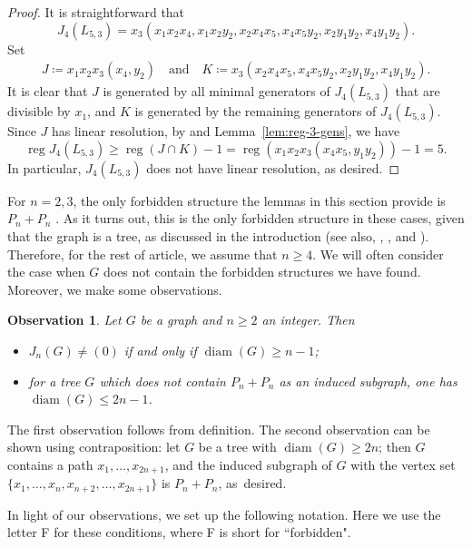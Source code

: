 \documentclass{amsart}
\newtheorem{observation}[theorem]{Observation}
\theoremstyle{remark}
\theoremstyle{definition}
\DeclareMathOperator{\reg}{reg}
\DeclareMathOperator{\diam}{diam}
\begin{document}
	\begin{proof}
		It is straightforward that 
		\[
		J_4(L_{5,3})= x_3(x_1x_2x_4,x_1x_2y_2,x_2x_4x_5,x_4x_5y_2,x_2y_1y_2,x_4y_1y_2).\]
		Set
		\begin{align*}
			J\coloneqq x_1x_2x_3(x_4,y_2) \quad \text{and} \quad 
			K\coloneqq x_3(x_2x_4x_5,x_4x_5y_2,x_2y_1y_2,x_4y_1y_2).
		\end{align*}
		It is clear that $J$ is generated by all minimal generators of $J_4(L_{5,3})$ that are divisible by $x_1$, and $K$ is generated by the remaining generators of $J_4(L_{5,3})$. Since $J$ has linear resolution, by \cite[Corollary 2.7]{FHV09} and Lemma~\ref{lem:reg-3-gens}, we have 
		\[
		\reg J_4(L_{5,3}) \geq \reg(J\cap K) - 1 = \reg \left( x_1x_2x_3(x_4x_5, y_1y_2) \right) -1 = 5.
		\]
		In particular, $J_4(L_{5,3})$ does not have linear resolution, as desired.
	\end{proof}
	
    For $n=2,3$, the only forbidden structure the lemmas in this section provide is $P_n+P_n$ . As it turns out, this is the only forbidden structure in these cases, given that the graph is a tree, as discussed in the introduction (see also, \cite[Proposition 3.9]{Zheng2004}, \cite[Theorem 3.2]{HHZ2004}, and  \cite[Theorem 5.1]{AJM2024}). Therefore, for the rest of article, we assume that $n\geq 4$. We will often consider the case when $G$ does not contain the forbidden structures we have found. Moreover, we make some observations.
    \begin{observation}\label{obser}
     Let $G$ be a graph and $n\geq 2$ an integer. Then
        \begin{itemize}
            \item $J_n(G)\neq (0)$ if and only if $\diam(G)\geq n-1$;
            \item for a tree $G$ which does not contain $P_n+P_n$ as an induced subgraph, one has $\diam(G)\leq 2n-1$.
        \end{itemize}
    \end{observation}
    
    
    The first observation follows from definition. The second observation can be shown using contraposition: let $G$ be a tree with $\diam(G)\geq  2n$; then $G$ contains a path $x_1,\dots, x_{2n+1}$, and the induced subgraph of $G$ with the vertex set $\{x_1,\dots, x_{n},x_{n+2},\dots, x_{2n+1}\}$ is $P_n+P_n$, as~desired.
    
    In light of our observations, we set up the following notation. Here we use the letter F for these conditions, where F is short for ``forbidden".
\end{document}
